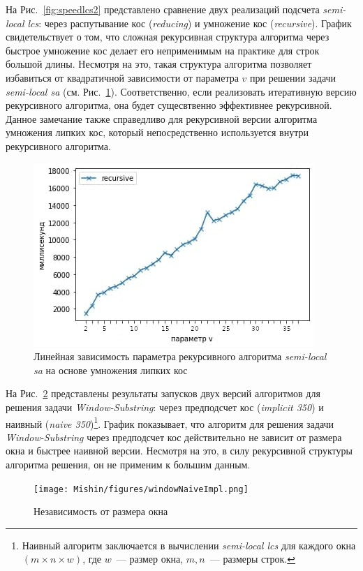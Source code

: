 На Рис.~\ref{fig:speedlcs2} представлено сравнение двух реализаций подсчета \emph{semi-local lcs}: через распутывание кос (\emph{reducing}) и умножение кос (\emph{recursive}).
График свидетельствует о том, что сложная рекурсивная структура алгоритма через быстрое умножение кос делает его неприменимым на практике для строк большой длины.
Несмотря на это, такая структура алгоритма позволяет избавиться от квадратичной зависимости от параметра $v$ при решении задачи \emph{semi-local sa} (см. Рис.~\ref{fig:vParam}).
Соответственно, если реализовать итеративную версию рекурсивного алгоритма, она будет сущесвтвенно эффективнее рекурсивной.
Данное замечание также справедливо для рекурсивной версии алгоритма умножения липких кос, который непосредственно используется внутри рекурсивного алгоритма.

\begin{figure}[t!]
\centering
    \includegraphics[width=0.8\columnwidth]{Mishin/figures/vDependenceImplicitSemiLocalSARecursie.png}
    \caption{Линейная зависимость параметра рекурсивного алгоритма \emph{semi-local sa} на основе умножения липких кос }\label{fig:vParam}
\end{figure}

На Рис.~\ref{fig:speedWindow3} представлены результаты запусков двух версий алгоритмов для решения задачи \emph{Window-Substring}: через предподсчет кос (\emph{implicit 350}) и наивный (\emph{naive 350})\footnote{Наивный алгоритм заключается в вычислении \emph{semi-local lcs} для каждого окна $(m \times n \times w)$, где $w$~--- размер окна, $m,n$~--- размеры строк.
}.
График  показывает, что алгоритм для решения задачи \emph{Window-Substring} через предподсчет кос действительно не зависит от размера окна и быстрее наивной версии.
Несмотря на это, в силу рекурсивной структуры алгоритма решения, он не применим к большим данным.

\begin{figure}[t!]
\centering
    \texttt{[image: Mishin/figures/windowNaiveImpl.png]}
    \caption{Независимость от размера окна }\label{fig:speedWindow3}
\end{figure}

